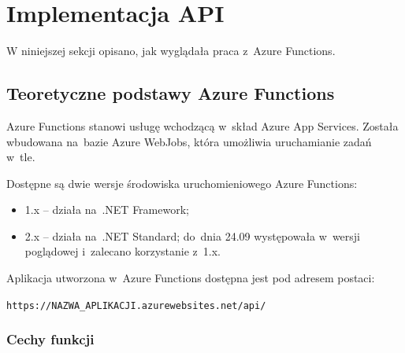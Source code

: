 \documentclass[12pt,a4paper,twoside,titlepage,openright]{book}
\begin{document}
\section{Implementacja API}


W niniejszej sekcji opisano, jak wyglądała praca z~Azure Functions.

\subsection{Teoretyczne podstawy Azure Functions}

Azure Functions stanowi usługę wchodzącą w~skład Azure App Services. Została wbudowana na~bazie Azure WebJobs, która umożliwia uruchamianie zadań w~tle.

Dostępne są dwie wersje środowiska uruchomieniowego Azure Functions: \cite{siteAzureFunctions2}
\begin{itemize}
\item 1.x -- działa na~.NET Framework;
\item 2.x -- działa na~.NET Standard; do~dnia 24.09 występowała w~wersji poglądowej i~zalecano korzystanie z~1.x.
\end{itemize} 

Aplikacja utworzona w~Azure Functions dostępna jest pod adresem postaci:

\texttt{https://NAZWA\_APLIKACJI.azurewebsites.net/api/}

\subsubsection{Cechy funkcji}
\end{document}
